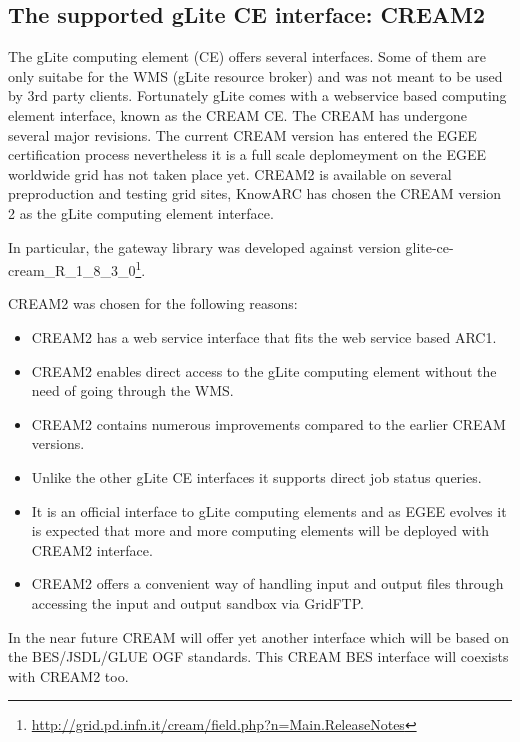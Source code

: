 \documentclass{article}
\begin{document}
\subsection{The supported gLite CE interface: CREAM2}
The gLite computing element (CE) offers several interfaces. Some of them are only suitabe for the WMS (gLite resource broker) and was not meant to be used by 3rd party clients. Fortunately gLite comes with a webservice based computing element interface, known as the CREAM CE. The CREAM has undergone several major revisions. The current CREAM version has entered the EGEE certification process nevertheless it is a full scale deplomeyment on the EGEE worldwide grid has not taken place yet. CREAM2 is available on several preproduction and testing grid sites, KnowARC has chosen the CREAM version 2\cite{cream} as the gLite computing element interface.\par
In particular, the gateway library was developed against version glite-ce-cream\_R\_1\_8\_3\_0\footnote{\url{http://grid.pd.infn.it/cream/field.php?n=Main.ReleaseNotes}}.\par
CREAM2 was chosen for the following reasons:
\begin{itemize}
\item CREAM2 has a web service interface that fits the web service based ARC1.
\item CREAM2 enables direct access to the gLite computing element without the need of going through the WMS.
\item CREAM2 contains numerous improvements compared to the earlier CREAM versions.
\item Unlike the other gLite CE interfaces it supports direct job status queries.
\item It is an official interface to gLite computing elements and as EGEE evolves it is expected that more and more computing elements will be deployed with CREAM2 interface.
\item CREAM2 offers a convenient way of handling input and output files through accessing the input and output sandbox via GridFTP.
\end{itemize}
In the near future CREAM will offer yet another interface which will be based on the BES/JSDL/GLUE OGF standards. This CREAM BES interface will coexists with CREAM2 too.\par
\end{document}
